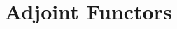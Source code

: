

\chapter{Adjoint Functors}





% 
% 
% 
% 
% 
% 
% 


% 
% 
% 
% 
% 


% 
% 
% 
% 
% 


% 
% 
% 


